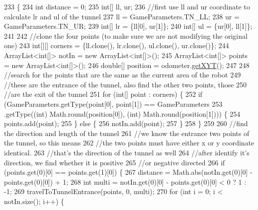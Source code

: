 \begin{DoxyCode}
233                                                  \{
234     \textcolor{keywordtype}{int} distance = 0;
235     \textcolor{keywordtype}{int}[] ll, ur;
236     \textcolor{comment}{//first use ll and ur coordinate to calculate lr and ul of the tunnel}
237     ll = GameParameters.TN\_LL;
238     ur = GameParameters.TN\_UR;
239     \textcolor{keywordtype}{int}[] lr = \{ll[0], ur[1]\};
240     \textcolor{keywordtype}{int}[] ul = \{ur[0], ll[1]\};
241     
242     \textcolor{comment}{//clone the four points (to make sure we are not modifying the original one)}
243     \textcolor{keywordtype}{int}[][] corners = \{ll.clone(), lr.clone(), ul.clone(), ur.clone()\};
244     ArrayList<int[]> notIn = \textcolor{keyword}{new} ArrayList<int[]>();
245     ArrayList<int[]> points = \textcolor{keyword}{new} ArrayList<int[]>();
246     \textcolor{keywordtype}{double}[] position = odometer.\hyperlink{classca_1_1mcgill_1_1ecse211_1_1odometer_1_1_odometer_data_a8f40f0264c68f0cbed4fff1723ae7863}{getXYT}();
247     
248     \textcolor{comment}{//search for the points that are the same as the current area of the robot}
249     \textcolor{comment}{//these are the entrance of the tunnel, also find the other two points, those}
250     \textcolor{comment}{//are the exit of the tunnel}
251     \textcolor{keywordflow}{for} (\textcolor{keywordtype}{int}[] point : corners) \{
252       \textcolor{keywordflow}{if} (GameParameters.getType(point[0], point[1]) == GameParameters
253           .getType((\textcolor{keywordtype}{int}) Math.round(position[0]), (int) Math.round(position[1]))) \{
254         points.add(point);
255       \} \textcolor{keywordflow}{else} \{
256         notIn.add(point);
257       \}
258     \}
259     
260     \textcolor{comment}{//find the direction and length of the tunnel}
261     \textcolor{comment}{//we know the entrance two points of the tunnel, so this means }
262     \textcolor{comment}{//the two points must have either x or y coordinate identical.}
263     \textcolor{comment}{//that's the direction of the tunnel as well}
264     \textcolor{comment}{//after identify it's direction, we find whether it is positive }
265     \textcolor{comment}{//or negative directed}
266     \textcolor{keywordflow}{if} (points.get(0)[0] == points.get(1)[0]) \{
267       distance = Math.abs(notIn.get(0)[0] - points.get(0)[0]) + 1;
268       \textcolor{keywordtype}{int} multi = notIn.get(0)[0] - points.get(0)[0] < 0 ? 1 : -1;
269       travelToTunnelEntrance(points, 0, multi);
270       \textcolor{keywordflow}{for} (\textcolor{keywordtype}{int} i = 0; i < notIn.size(); i++) \{

\end{DoxyCode}
